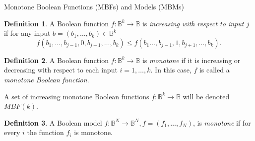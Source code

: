 \documentclass[aspectratio=169,9pt]{beamer}
\newcommand{\bbB}{\mathbb{B}}
\theoremstyle{definition}
\newtheorem{defn}{Definition}
\theoremstyle{remark}
\begin{document}
\begin{frame}{Monotone Boolean Functions (MBFs) and Models (MBMs)}
\begin{defn}
A Boolean function $f \colon \bbB^k \to \bbB$ is \emph{increasing with respect to input $j$} if for any input $b=(b_1, \ldots, b_k) \in \bbB^k$
\[
f(b_1, \ldots, b_{j-1}, 0, b_{j+1}, \ldots, b_k) \leq f(b_1 \ldots, b_{j-1}, 1, b_{j+1}, \ldots, b_k).
\]
\end{defn}

\begin{defn}
A Boolean function $f \colon \bbB^k \to \bbB$ is \emph{monotone} if it is increasing or decreasing with respect to each input $i=1, \ldots, k$. In this case, $f$ is called a \emph{monotone Boolean function}.

A set of increasing monotone Boolean functions $f \colon \bbB^k \to \bbB$ will be denoted $MBF(k)$. 
\end{defn}

\begin{defn}
A Boolean model $f \colon \bbB^N \to \bbB^N, f=(f_1, \ldots, f_N)$, is \emph{monotone} if for every $i$ the function $f_i$ is monotone.
\end{defn}

\end{frame}
\end{document}
